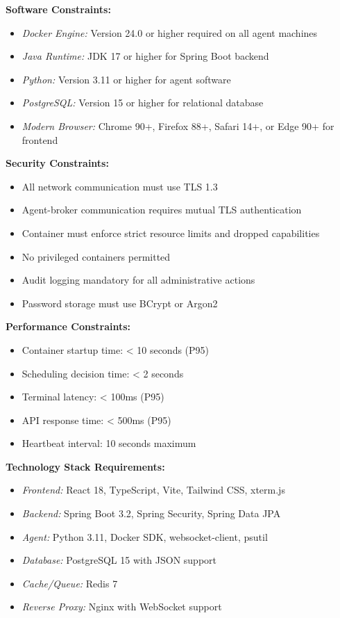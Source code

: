 \documentclass[12pt,a4paper]{article}
\begin{document}
\textbf{Software Constraints:}

\begin{itemize}
    \item \textit{Docker Engine:} Version 24.0 or higher required on all agent machines
    \item \textit{Java Runtime:} JDK 17 or higher for Spring Boot backend
    \item \textit{Python:} Version 3.11 or higher for agent software
    \item \textit{PostgreSQL:} Version 15 or higher for relational database
    \item \textit{Modern Browser:} Chrome 90+, Firefox 88+, Safari 14+, or Edge 90+ for frontend
\end{itemize}

\textbf{Security Constraints:}

\begin{itemize}
    \item All network communication must use TLS 1.3
    \item Agent-broker communication requires mutual TLS authentication
    \item Container must enforce strict resource limits and dropped capabilities
    \item No privileged containers permitted
    \item Audit logging mandatory for all administrative actions
    \item Password storage must use BCrypt or Argon2
\end{itemize}

\textbf{Performance Constraints:}

\begin{itemize}
    \item Container startup time: < 10 seconds (P95)
    \item Scheduling decision time: < 2 seconds
    \item Terminal latency: < 100ms (P95)
    \item API response time: < 500ms (P95)
    \item Heartbeat interval: 10 seconds maximum
\end{itemize}
\textbf{Technology Stack Requirements:}

\begin{itemize}
    \item \textit{Frontend:} React 18, TypeScript, Vite, Tailwind CSS, xterm.js
    \item \textit{Backend:} Spring Boot 3.2, Spring Security, Spring Data JPA
    \item \textit{Agent:} Python 3.11, Docker SDK, websocket-client, psutil
    \item \textit{Database:} PostgreSQL 15 with JSON support
    \item \textit{Cache/Queue:} Redis 7
    \item \textit{Reverse Proxy:} Nginx with WebSocket support
\end{itemize}
\end{document}
